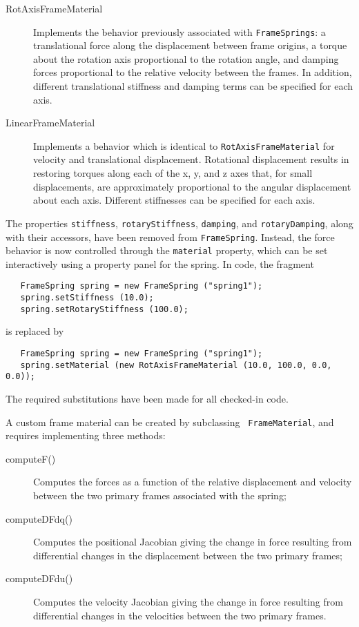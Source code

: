 \documentclass{article}
\begin{document}
\begin{description}

\item[RotAxisFrameMaterial] \mbox{} Implements the behavior previously
associated with {\tt FrameSprings}: a translational force along the
displacement between frame origins, a torque about the rotation axis
proportional to the rotation angle, and damping forces proportional to
the relative velocity between the frames.
In addition, different translational stiffness and damping terms can
be specified for each axis.

\item[LinearFrameMaterial] \mbox{} Implements a behavior which is
identical to {\tt RotAxisFrameMaterial} for velocity and translational
displacement. Rotational displacement results in restoring torques
along each of the x, y, and z axes that, for small displacements, are
approximately proportional to the angular displacement about each
axis.  Different stiffnesses can be specified for each axis.

\end{description}

The properties {\tt stiffness}, {\tt rotaryStiffness}, {\tt damping},
and {\tt rotaryDamping}, along with their accessors, have been removed
from {\tt FrameSpring}. Instead, the force behavior is now controlled
through the {\tt material} property, which can be set interactively
using a property panel for the spring. In code, the fragment
\begin{lstlisting}
   FrameSpring spring = new FrameSpring ("spring1");
   spring.setStiffness (10.0);
   spring.setRotaryStiffness (100.0);
\end{lstlisting}
is replaced by
\begin{lstlisting}
   FrameSpring spring = new FrameSpring ("spring1");
   spring.setMaterial (new RotAxisFrameMaterial (10.0, 100.0, 0.0, 0.0));
\end{lstlisting}

The required substitutions have been made for all checked-in code.

A custom frame material can be created by subclassing {\tt
FrameMaterial}, and requires implementing three methods:

\begin{description}

\item[computeF()] \mbox{}
Computes the forces as a function of the relative displacement and
velocity between the two primary frames associated with the spring;

\item[computeDFdq()] \mbox{}
Computes the positional Jacobian giving the change in force
resulting from differential changes in the displacement
between the two primary frames;

\item[computeDFdu()] \mbox{} Computes the velocity Jacobian giving the
change in force resulting from differential changes in the
velocities between the two primary frames.

\end{description}
\end{document}
